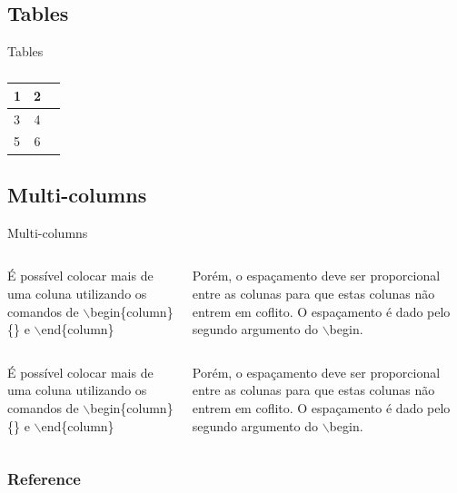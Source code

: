 \documentclass{libs/XJTLU_format}
\begin{document}
\subsection{Tables}
\begin{frame}{Tables}
\begin{table}[hbt]
  \begin{tabular}{l|cc}
    1& 2& \\
    \hline
    3& 4& \\
    5& 6&
  \end{tabular}
  \caption{}
\end{table}

\end{frame}

\subsection{Multi-columns}
\begin{frame}{Multi-columns}
    \begin{columns}{}
        \begin{column}{0.5\textwidth}
            \justify
            É possível colocar mais de uma coluna utilizando os comandos de $\backslash$begin\{column\}\{\} e $\backslash$end\{column\}
        \end{column}
        \begin{column}{0.5\textwidth}
            \justify
            Porém, o espaçamento deve ser proporcional entre as colunas para que estas colunas não entrem em coflito. O espaçamento é dado pelo segundo argumento do $\backslash$begin.
        \end{column}
    \end{columns}   
    \begin{columns}{}
        \begin{column}{0.5\textwidth}
            \justify
            É possível colocar mais de uma coluna utilizando os comandos de $\backslash$begin\{column\}\{\} e $\backslash$end\{column\}
        \end{column}
        \begin{column}{0.5\textwidth}
            \justify
            Porém, o espaçamento deve ser proporcional entre as colunas para que estas colunas não entrem em coflito. O espaçamento é dado pelo segundo argumento do $\backslash$begin.
        \end{column}
    \end{columns}     
\end{frame}


\begin{frame}[allowframebreaks]
    \frametitle{Reference}
    \printbibliography
\end{frame}

\begin{frame}{}
    \centering
    \huge{\textbf{}}
    
    
\end{frame}
\end{document}
